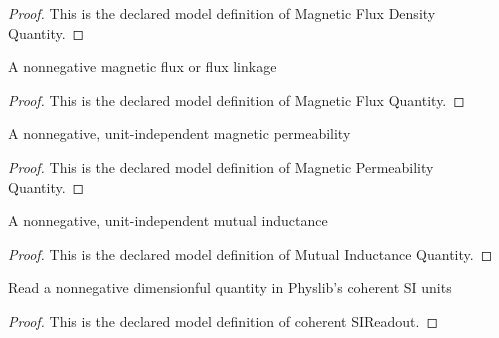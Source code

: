 \begin{proof}
  This is the declared model definition of Magnetic Flux Density Quantity.
\end{proof}
\begin{definition}
  \label{def:physics:phyx-mini-0939:phyxminiproblems-problemphyxmini0939-magneticfluxquantity}
  A nonnegative magnetic flux or flux linkage
\end{definition}
\begin{proof}
  This is the declared model definition of Magnetic Flux Quantity.
\end{proof}
\begin{definition}
  \label{def:physics:phyx-mini-0939:phyxminiproblems-problemphyxmini0939-magneticpermeabilityquantity}
  A nonnegative, unit-independent magnetic permeability
\end{definition}
\begin{proof}
  This is the declared model definition of Magnetic Permeability Quantity.
\end{proof}
\begin{definition}
  \label{def:physics:phyx-mini-0939:phyxminiproblems-problemphyxmini0939-mutualinductancequantity}
  A nonnegative, unit-independent mutual inductance
\end{definition}
\begin{proof}
  This is the declared model definition of Mutual Inductance Quantity.
\end{proof}
\begin{definition}
  \label{def:physics:phyx-mini-0939:phyxminiproblems-problemphyxmini0939-coherentsireadout}
  Read a nonnegative dimensionful quantity in Physlib's coherent SI units
\end{definition}
\begin{proof}
  This is the declared model definition of coherent SIReadout.
\end{proof}
